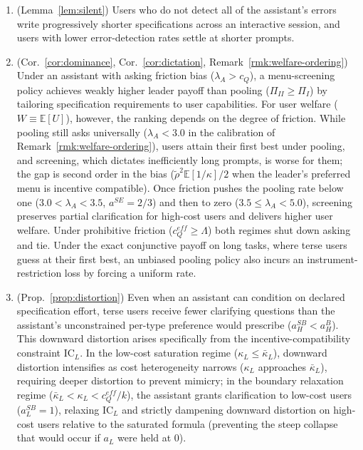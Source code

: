 \documentclass[11pt]{article}
\begin{document}
\begin{enumerate}[leftmargin=*]
\item[\textbf{P5}] (Lemma~\ref{lem:silent}) Users who do not detect all of the assistant's errors write progressively shorter specifications across an interactive session, and users with lower error-detection rates settle at shorter prompts.
\item[\textbf{P6}] (Cor.~\ref{cor:dominance}, Cor.~\ref{cor:dictation}, Remark~\ref{rmk:welfare-ordering}) Under an assistant with asking friction bias ($\lambda_A > c_Q$), a menu-screening policy achieves weakly higher leader payoff than pooling ($\Pi_{II} \ge \Pi_I$) by tailoring specification requirements to user capabilities. For user welfare ($W \equiv \mathbb{E}[U]$), however, the ranking depends on the degree of friction. While pooling still asks universally ($\lambda_A < 3.0$ in the calibration of Remark~\ref{rmk:welfare-ordering}), users attain their first best under pooling, and screening, which dictates inefficiently long prompts, is worse for them; the gap is second order in the bias ($\tilde\rho^2\mathbb{E}[1/\kappa]/2$ when the leader's preferred menu is incentive compatible). Once friction pushes the pooling rate below one ($3.0 < \lambda_A < 3.5$, $a^{SE} = 2/3$) and then to zero ($3.5 \le \lambda_A < 5.0$), screening preserves partial clarification for high-cost users and delivers higher user welfare. Under prohibitive friction ($c_Q^{eff} \ge \Lambda$) both regimes shut down asking and tie. Under the exact conjunctive payoff on long tasks, where terse users guess at their first best, an unbiased pooling policy also incurs an instrument-restriction loss by forcing a uniform rate.
\item[\textbf{P7}] (Prop.~\ref{prop:distortion}) Even when an assistant can
condition on declared specification effort, terse users receive fewer clarifying questions
than the assistant's unconstrained per-type preference would prescribe ($a_H^{SB} < a_H^B$). This downward distortion arises
specifically from the incentive-compatibility constraint $\text{IC}_L$. In the low-cost saturation regime ($\kappa_L \le \bar\kappa_L$), downward distortion intensifies as cost heterogeneity narrows ($\kappa_L$ approaches $\bar\kappa_L$), requiring deeper distortion to prevent mimicry; in the boundary relaxation regime ($\bar\kappa_L < \kappa_L < c_Q^{eff}/k$), the assistant grants clarification to low-cost users ($a_L^{SB} = 1$), relaxing $\text{IC}_L$ and strictly dampening downward distortion on high-cost users relative to the saturated formula (preventing the steep collapse that would occur if $a_L$ were held at 0).

\end{enumerate}
\end{document}
